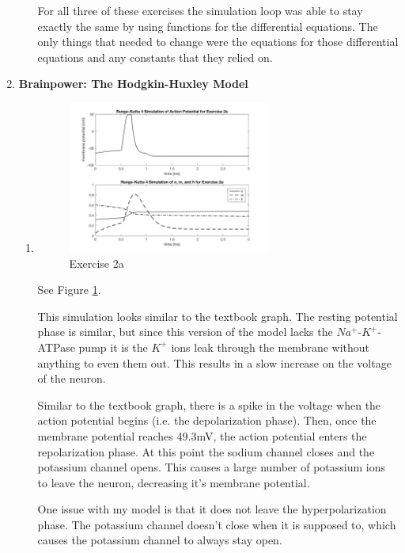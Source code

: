 \documentclass[12pt]{article}
\begin{document}
\begin{enumerate}
\begin{enumerate}
       For all three of these exercises the simulation loop was able to stay exactly the same by using functions for the differential equations. The only things that needed to change were the equations for those differential equations and any constants that they relied on.
  
  \end{enumerate}
  
  \item \textbf{Brainpower: The Hodgkin-Huxley Model}
  	\begin{enumerate}
	
			\item
  			\begin{figure}[h!]
  			 \includegraphics[width=0.666\textwidth]{2a-1}
  			 \centering
         \caption{Exercise 2a}
         \label{fig:2a-1}
       \end{figure}
				See Figure \ref{fig:2a-1}.
				
				This simulation looks similar to the textbook graph. The resting potential phase is similar, but since this version of the model lacks the $Na^+$-$K^+$-ATPase pump it is the $K^+$ ions leak through the membrane without anything to even them out. This results in a slow increase on the voltage of the neuron.
				
				Similar to the textbook graph, there is a spike in the voltage when the action potential begins (i.e. the depolarization phase). Then, once the membrane potential reaches 49.3mV, the action potential enters the repolarization phase. At this point the sodium channel closes and the potassium channel opens. This causes a large number of potassium ions to leave the neuron, decreasing it's membrane potential.
				
				One issue with my model is that it does not leave the hyperpolarization phase. The potassium channel doesn't close when it is supposed to, which causes the potassium channel to always stay open.
				 

\end{enumerate}
\end{enumerate}
\end{document}
